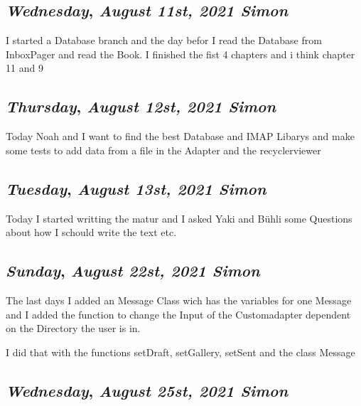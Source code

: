 \begin{center}
\section*{\month}
\end{center}


\def\day{\textit{August 11st, 2021 Simon}}
\def\weekday{\textit{Wednesday}}
\subsection*{\weekday, \day}

I started a Database branch and the day befor I read the Database from InboxPager and read the Book. 
I finished the fist 4 chapters and i think chapter 11 and 9



\def\day{\textit{August 12st, 2021 Simon}}
\def\weekday{\textit{Thursday}}
\subsection*{\weekday, \day}

Today Noah and I want to find the best Database and IMAP Libarys 
and make some tests to add data from a file in the Adapter and the recyclerviewer


\def\day{\textit{August 13st, 2021 Simon}}
\def\weekday{\textit{Tuesday}}
\subsection*{\weekday, \day}

Today I started writting the matur and I asked Yaki and Bühli some Questions about 
how I schould write the text etc. 

\def\day{\textit{August 22st, 2021 Simon}}
\def\weekday{\textit{Sunday}}
\subsection*{\weekday, \day}

The last days I added an Message Class wich has the variables for one Message and I added the function
to change the Input of the Customadapter dependent on the Directory the user is in.

I did that with the functions setDraft, setGallery, setSent and the class Message


\def\day{\textit{August 25st, 2021 Simon}}
\def\weekday{\textit{Wednesday}}
\subsection*{\weekday, \day}

